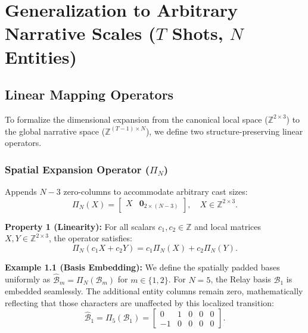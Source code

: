 \documentclass[sigconf,review,anonymous]{acmart}
\newcommand{\calB}{\mathcal{B}}
\begin{document}
\section{Generalization to Arbitrary Narrative Scales ($T$ Shots, $N$ Entities)}
\label{app:generalization}



\subsection{Linear Mapping Operators}
To formalize the dimensional expansion from the canonical local space ($\mathbb{Z}^{2\times 3}$) to the global narrative space ($\mathbb{Z}^{(T-1) \times N}$), we define two structure-preserving linear operators.




\subsubsection{\textbf{Spatial Expansion Operator ($\Pi_N$)}}
Appends $N-3$ zero-columns to accommodate arbitrary cast sizes:
\begin{equation}
    \Pi_N(X) = \begin{bmatrix} X & \mathbf{0}_{2\times(N-3)} \end{bmatrix}, \quad X \in \mathbb{Z}^{2\times 3}.
\end{equation}

\noindent\textbf{Property 1 (Linearity):} For all scalars $c_1, c_2 \in \mathbb{Z}$ and local matrices $X, Y \in \mathbb{Z}^{2\times 3}$, the operator satisfies:
\begin{equation}
    \Pi_N(c_1 X + c_2 Y) = c_1\Pi_N(X) + c_2\Pi_N(Y).
\end{equation}

\noindent\textbf{Example 1.1 (Basis Embedding):} We define the spatially padded bases uniformly as $\hat{\calB}_m = \Pi_N(\calB_m)$ for $m \in \{1,2\}$. For $N=5$, the Relay basis $\calB_1$ is embedded seamlessly. The additional entity columns remain zero, mathematically reflecting that those characters are unaffected by this localized transition:
\begin{equation}
    \hat{\calB}_1 = \Pi_5(\calB_1) = \begin{bmatrix} 0 & 1 & 0 & 0 & 0 \\ -1 & 0 & 0 & 0 & 0 \end{bmatrix}.
\end{equation}
\end{document}
